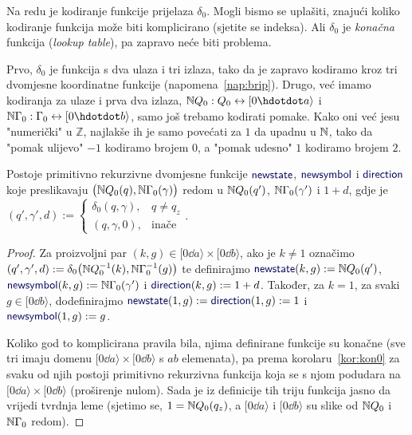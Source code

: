 Na redu je kodiranje funkcije prijelaza $\delta_0$. Mogli bismo se uplašiti, znajući koliko kodiranje funkcija može biti komplicirano (sjetite se indeksa). Ali $\delta_0$ je \emph{konačna} funkcija (\emph{lookup table}), pa zapravo neće biti problema.

Prvo, $\delta_0$ je funkcija s dva ulaza i tri izlaza, tako da je zapravo kodiramo kroz tri dvomjesne koordinatne funkcije (napomena~\ref{nap:brip}). Drugo, već imamo kodiranja za ulaze i prva dva izlaza, $\N Q_0:Q_0\leftrightarrow[0\dd a\rangle$ i $\N\Gamma_0:\Gamma_0\leftrightarrow[0\dd b\rangle$, samo još trebamo kodirati pomake. Kako oni već jesu "numerički" u $\mathbb Z$, najlakše ih je samo povećati za $1$ da upadnu u ${\mathbb N}$, tako da "pomak ulijevo" $-1$ kodiramo brojem $0$, a "pomak udesno" $1$ kodiramo brojem $2$.

\begin{lema}[{name=[primitivna rekurzivnost funkcije prijelaza]}]\label{lm:newssdprn}
Postoje primitivno rekurzivne dvomjesne funkcije $\f{newstate}$, $\f{newsymbol}$ i $\f{direction}$ koje preslikavaju $\bigl({\mathbb N} Q_0(q),{\mathbb N}\Gamma_0(\gamma)\bigr)$ redom u ${\mathbb N} Q_0(q')$, ${\mathbb N}\Gamma_0(\gamma')$ i $1+d$, gdje je
$(q',\gamma',d):=\begin{cases}
\delta_0(q,\gamma),& q\ne q_z\\
(q,\gamma,0),&\text{inače}\end{cases}$.
\end{lema}
\begin{proof}
Za proizvoljni par $(k,g)\in[0\dd a\rangle\times[0\dd b\rangle$, ako je $k\ne 1$ označimo $(q',\gamma',d):=\delta_0\bigl({\mathbb N} Q_0^{-1}(k),{\mathbb N}\Gamma_0^{-1}(g)\bigr)$ te definirajmo $\f{newstate}(k,g):=\N Q_0(q')$, $\f{newsymbol}(k,g):=\N\Gamma_0(\gamma')$ i $\f{direction}(k,g):=1+d$. Također, za $k=1$, za svaki $g\in[0\dd b\rangle$, dodefinirajmo $\f{newstate}(1,g):=\f{direction}(1,g):=1$ i $\f{newsymbol}(1,g):=g$.

Koliko god to komplicirana pravila bila, njima definirane funkcije su konačne (sve tri imaju domenu $[0\dd a\rangle\times[0\dd b\rangle$ s $ab$ elemenata), pa prema korolaru~\ref{kor:kon0} za svaku od njih postoji primitivno rekurzivna funkcija koja se s njom podudara na $[0\dd a\rangle\times[0\dd b\rangle$ (proširenje nulom). Sada je iz definicije tih triju funkcija jasno da vrijedi tvrdnja leme (sjetimo se, $1={\mathbb N} Q_0(q_z)$, a $[0\dd a\rangle$ i $[0\dd b\rangle$ su slike od ${\mathbb N} Q_0$ i ${\mathbb N}\Gamma_0$ redom).
\end{proof}

